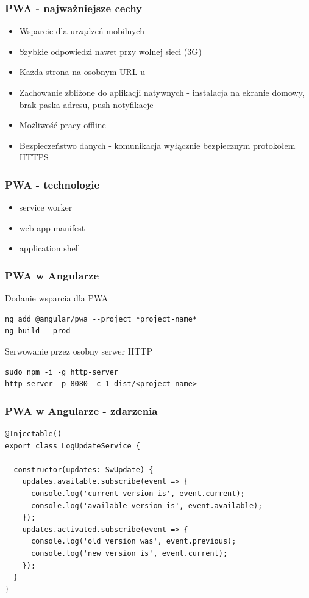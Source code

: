 \documentclass{beamer}
\begin{document}
\begin{frame}
    \frametitle{PWA - najważniejsze cechy}
    \begin{itemize}
        \item Wsparcie dla urządzeń mobilnych
        \item Szybkie odpowiedzi nawet przy wolnej sieci (3G)
        \item Każda strona na osobnym URL-u
        \item Zachowanie zbliżone do aplikacji natywnych - instalacja na ekranie domowy, brak paska adresu, push notyfikacje
        \item Możliwość pracy offline
        \item Bezpieczeństwo danych - komunikacja wyłącznie bezpiecznym protokołem HTTPS
    \end{itemize}
\end{frame}

\begin{frame}
    \frametitle{PWA - technologie}
    \begin{itemize}
        \item service worker
        \item web app manifest
        \item application shell
    \end{itemize}
\end{frame}

\begin{frame}[fragile]
    \frametitle{PWA w Angularze}
    Dodanie wsparcia dla PWA
\begin{lstlisting}
ng add @angular/pwa --project *project-name*
ng build --prod
\end{lstlisting}
    Serwowanie przez osobny serwer HTTP
\begin{lstlisting}
sudo npm -i -g http-server
http-server -p 8080 -c-1 dist/<project-name>
\end{lstlisting}
\end{frame}

\begin{frame}[fragile]
    \frametitle{PWA w Angularze - zdarzenia}
\begin{lstlisting}
@Injectable()
export class LogUpdateService {

  constructor(updates: SwUpdate) {
    updates.available.subscribe(event => {
      console.log('current version is', event.current);
      console.log('available version is', event.available);
    });
    updates.activated.subscribe(event => {
      console.log('old version was', event.previous);
      console.log('new version is', event.current);
    });
  }
}
\end{lstlisting}
\end{frame}
\end{document}
